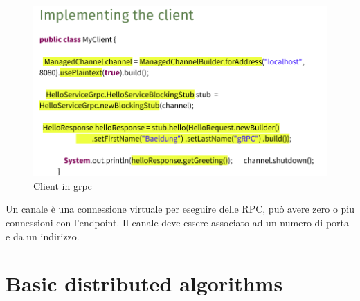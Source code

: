 \documentclass[12pt]{article}
\begin{document}
		\begin{figure}[h!]
			\centering
			\includegraphics[scale=0.30]{img/grpc.png}
			\caption{Client in grpc}
		\end{figure}
		Un canale è una connessione virtuale per eseguire delle RPC, può avere zero o piu connessioni con l'endpoint. Il canale deve essere associato ad un numero di porta e da un indirizzo.
		
		
\section{Basic distributed algorithms}
\end{document}
